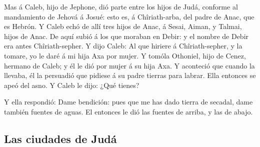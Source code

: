  Mas á Caleb, hijo de Jephone, dió parte entre los hijos de
Judá, conforme al mandamiento de Jehová á Josué: esto es, á
Chîriath-arba, del padre de Anac, que es Hebrón.  Y Caleb
echó de allí tres hijos de Anac, á Sesai, Aiman, y Talmai, hijos de
Anac.  De aquí subió á los que moraban en Debir: y el
nombre de Debir era antes Chîriath-sepher.  Y dijo Caleb:
Al que hiriere á Chîriath-sepher, y la tomare, yo le daré á mi hija Axa
por mujer.  Y tomóla Othoniel, hijo de Cenez, hermano de
Caleb; y él le dió por mujer á su hija Axa.  Y aconteció
que cuando la llevaba, él la persuadió que pidiese á su padre tierras
para labrar. Ella entonces se apeó del asno. Y Caleb le dijo: ¿Qué
tienes?

 Y ella respondió: Dame bendición: pues que me has dado
tierra de secadal, dame también fuentes de aguas. El entonces le dió las
fuentes de arriba, y las de abajo.

\hypertarget{las-ciudades-de-juduxe1}{%
\subsection{Las ciudades de Judá}\label{las-ciudades-de-juduxe1}}

